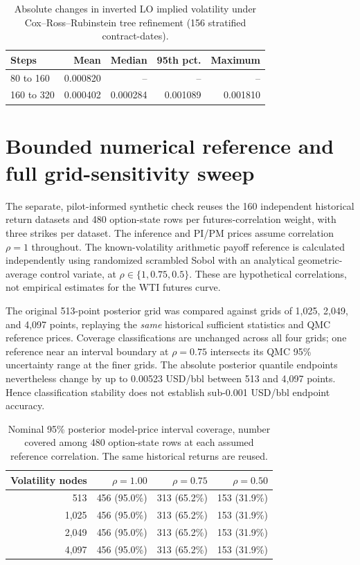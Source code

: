 \documentclass[10pt]{article}
\renewcommand{\thetable}{S\arabic{section}}
\begin{document}
\begin{table}[htbp]\centering\small
\renewcommand{\thetable}{S4b}
\caption{Absolute changes in inverted LO implied volatility under
Cox--Ross--Rubinstein tree refinement (156 stratified contract-dates).}
\label{tab:s4b}
\begin{tabular}{lrrrr}\toprule
Steps & Mean & Median & 95th pct. & Maximum\\\midrule
80 to 160 & 0.000820 & -- & -- & --\\
160 to 320 & 0.000402 & 0.000284 & 0.001089 & 0.001810\\\bottomrule
\end{tabular}
\end{table}

\renewcommand{\thetable}{S\arabic{section}}
\section{Bounded numerical reference and full grid-sensitivity sweep}
The separate, pilot-informed synthetic check reuses the 160 independent
historical return datasets and 480 option-state rows per futures-correlation
weight, with three strikes per dataset. The inference and PI/PM prices
assume correlation $\rho=1$ throughout. The known-volatility arithmetic
payoff reference is calculated independently using randomized scrambled
Sobol with an analytical geometric-average control variate, at
$\rho\in\{1,0.75,0.5\}$. These are hypothetical correlations, not empirical
estimates for the WTI futures curve.

The original 513-point posterior grid was compared against grids of
1,025, 2,049, and 4,097 points, replaying the \emph{same}
historical sufficient statistics and QMC reference prices. Coverage
classifications are unchanged across all four grids; one reference
near an interval boundary at $\rho=0.75$ intersects its QMC 95\%
uncertainty range at the finer grids. The absolute posterior
quantile endpoints nevertheless change by up to 0.00523 USD/bbl
between 513 and 4,097 points. Hence classification stability
does not establish sub-0.001 USD/bbl endpoint accuracy.

\begin{table}[htbp]\centering\small
\caption{Nominal 95\% posterior model-price interval coverage,
number covered among 480 option-state rows at each assumed
reference correlation. The same historical returns are reused.}\label{tab:s5}
\begin{tabular}{rrrr}\toprule
Volatility nodes & $\rho=1.00$ & $\rho=0.75$ & $\rho=0.50$\\\midrule
513 & 456 (95.0\%) & 313 (65.2\%) & 153 (31.9\%)\\
1,025 & 456 (95.0\%) & 313 (65.2\%) & 153 (31.9\%)\\
2,049 & 456 (95.0\%) & 313 (65.2\%) & 153 (31.9\%)\\
4,097 & 456 (95.0\%) & 313 (65.2\%) & 153 (31.9\%)\\\bottomrule
\end{tabular}
\end{table}
\end{document}

